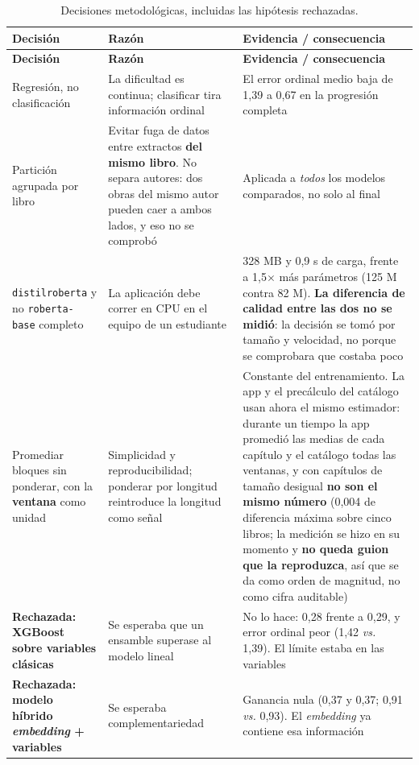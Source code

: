 \documentclass[11pt,a4paper]{article}
\newcommand{\cod}[1]{\texttt{\small #1}}
\begin{document}
\begin{small}
\begin{longtable}{@{}L{3.7cm} L{4.0cm} L{6.0cm}@{}}
\toprule
\textbf{Decisión} & \textbf{Razón} & \textbf{Evidencia / consecuencia} \\
\midrule
\endfirsthead
\toprule
\textbf{Decisión} & \textbf{Razón} & \textbf{Evidencia / consecuencia} \\
\midrule
\endhead
\bottomrule
\endfoot
\bottomrule
\caption{Decisiones metodológicas, incluidas las hipótesis rechazadas.}
\label{cuad:decisiones}
\endlastfoot
Regresión, no clasificación & La dificultad es continua; clasificar tira información ordinal & El error ordinal medio baja de 1,39 a 0,67 en la progresión completa \\
\addlinespace
Partición agrupada por libro & Evitar fuga de datos entre extractos \textbf{del mismo libro}. No separa autores: dos obras del mismo autor pueden caer a ambos lados, y eso no se comprobó & Aplicada a \emph{todos} los modelos comparados, no solo al final \\
\addlinespace
\cod{distilroberta} y no \cod{roberta-base} completo & La aplicación debe correr en CPU en el equipo de un estudiante & 328 MB y 0,9 s de carga, frente a 1,5$\times$ más parámetros (125 M contra 82 M). \textbf{La diferencia de calidad entre las dos no se midió}: la decisión se tomó por tamaño y velocidad, no porque se comprobara que costaba poco \\
\addlinespace
Promediar bloques sin ponderar, con la \textbf{ventana} como unidad & Simplicidad y reproducibilidad; ponderar por longitud reintroduce la longitud como señal & Constante del entrenamiento. La app y el precálculo del catálogo usan ahora el mismo estimador: durante un tiempo la app promedió las medias de cada capítulo y el catálogo todas las ventanas, y con capítulos de tamaño desigual \textbf{no son el mismo número} (0,004 de diferencia máxima sobre cinco libros; la medición se hizo en su momento y \textbf{no queda guion que la reproduzca}, así que se da como orden de magnitud, no como cifra auditable) \\
\addlinespace
\textbf{Rechazada: XGBoost sobre variables clásicas} & Se esperaba que un ensamble superase al modelo lineal & No lo hace: 0,28 frente a 0,29, y error ordinal peor (1,42 \emph{vs.} 1,39). El límite estaba en las variables \\
\addlinespace
\textbf{Rechazada: modelo híbrido \emph{embedding} + variables} & Se esperaba complementariedad & Ganancia nula (0,37 y 0,37; 0,91 \emph{vs.} 0,93). El \emph{embedding} ya contiene esa información \\

\end{longtable}
\end{small}
\end{document}
